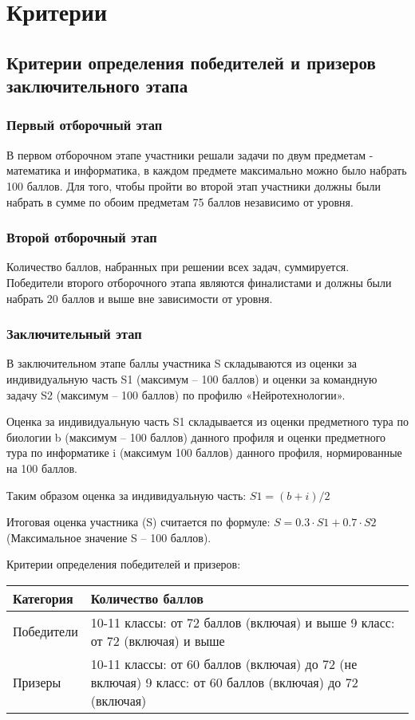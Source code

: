 \part{Критерии}

\chapter{Критерии определения победителей и призеров заключительного этапа}
 
\section{Первый отборочный этап}

В первом отборочном этапе участники решали задачи по двум предметам - математика и информатика, в каждом предмете максимально можно было набрать 100 баллов. Для того, чтобы пройти во второй этап участники должны были набрать в сумме по обоим предметам 75 баллов независимо от уровня.

\section{Второй отборочный этап}

Количество баллов, набранных при решении всех задач, суммируется. Победители второго отборочного этапа являются финалистами и должны были набрать 20 баллов и выше вне зависимости от уровня.

\section{Заключительный этап}

В заключительном этапе баллы участника S складываются из оценки за индивидуальную часть S1 (максимум – 100 баллов) и оценки за командную задачу S2 (максимум – 100 баллов) по профилю «Нейротехнологии».  

Оценка за индивидуальную часть S1 складывается из оценки предметного тура по биологии b (максимум – 100 баллов) данного профиля и оценки предметного тура по информатике i (максимум 100 баллов) данного профиля, нормированные на 100 баллов. 

Таким образом оценка за индивидуальную часть: $S1 = (b + i)/2$

Итоговая оценка участника (S) считается по формуле: $S = 0.3 \cdot S1 + 0.7 \cdot S2$ (Максимальное значение S – 100 баллов).
 
Критерии определения победителей и призеров:
\begin{center}
    \begin{tabular}{|l|p{7cm}|}
        \hline
        Категория&Количество баллов\\
        \hline
        Победители&10-11 классы: от 72 баллов (включая) и 
        выше 9 класс: от 72 (включая) и выше \\
        \hline
        Призеры&10-11 классы: от 60 баллов (включая) до 72 (не включая)
        9 класс: от 60 баллов (включая) до 72 (включая) \\
        \hline
    \end{tabular}
\end{center}